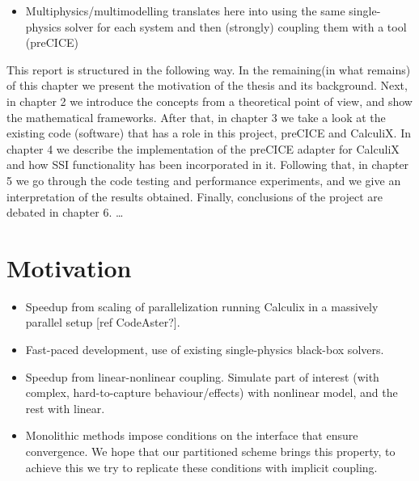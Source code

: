 \documentclass[a4paper, 11pt, oneside]{Thesis}  %
\begin{document}
\begin{itemize}


        \item Multiphysics/multimodelling translates here into using the same single-physics solver for each system and then (strongly) coupling them with a tool (preCICE)
    \end{itemize}
    
    This report is structured in the following way. In the remaining(in what remains) of this chapter we present the motivation of the thesis and its background. Next, in chapter 2 we introduce the concepts from a theoretical point of view, and show the mathematical frameworks. After that, in chapter 3 we take a look at the existing code (software) that has a role in this project, preCICE and CalculiX. In chapter 4 we describe the implementation of the preCICE adapter for CalculiX and how SSI functionality has been incorporated in it. Following that, in chapter 5 we go through the code testing and performance experiments, and we give an interpretation of the results obtained. Finally, conclusions of the project are debated in chapter 6. \ldots
    
    \section{Motivation}
    
        \begin{itemize}
            \item Speedup from scaling of parallelization running Calculix in a massively parallel setup [ref CodeAster?].
            \item Fast-paced development, use of existing single-physics black-box solvers.
            \item Speedup from linear-nonlinear coupling. Simulate part of interest (with complex, hard-to-capture behaviour/effects) with nonlinear model, and the rest with linear.
            \item Monolithic methods impose conditions on the interface that ensure convergence. We hope that our partitioned scheme brings this property, to achieve this we try to replicate these conditions with implicit coupling.
        \end{itemize}
    
\end{document}
